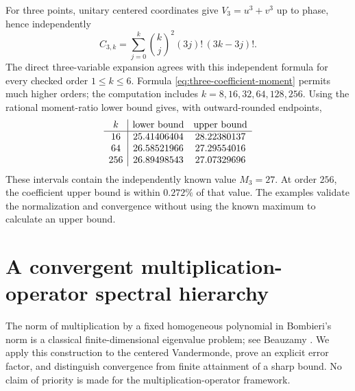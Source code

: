 \documentclass[11pt]{article}
\theoremstyle{remark}
\numberwithin{equation}{section}
\begin{document}
For three points, unitary centered coordinates give
$V_3=u^3+v^3$ up to phase, hence independently
\begin{equation}\label{eq:three-coefficient-moment}
 C_{3,k}=\sum_{j=0}^k\binom kj^2(3j)!\,(3k-3j)!.
\end{equation}
The direct three-variable expansion agrees with this independent
formula for every checked order $1\le k\le6$. Formula
\eqref{eq:three-coefficient-moment} permits much higher orders;
the computation includes $k=8,16,32,64,128,256$. Using the rational
moment-ratio lower bound gives, with outward-rounded endpoints,
\[
 \begin{array}{c|cc}
 k&\hbox{lower bound}&\hbox{upper bound}\\\hline
 16&25.41406404&28.22380137\\
 64&26.58521966&27.29554016\\
 256&26.89498543&27.07329696
 \end{array}
\]
These intervals contain the independently known value $M_3=27$.
At order $256$, the coefficient upper bound is within $0.272\%$
of that value. The examples validate the normalization and
convergence without using the known maximum to calculate an upper
bound.

\section{A convergent multiplication-operator spectral hierarchy}
\label{sec:spectral-hierarchy}
The norm of multiplication by a fixed homogeneous polynomial in
Bombieri's norm is a classical finite-dimensional eigenvalue problem;
see Beauzamy \cite{Beauzamy}. We apply this construction to the centered
Vandermonde, prove an explicit error factor, and distinguish convergence
from finite attainment of a sharp bound. No claim of priority is made
for the multiplication-operator framework.
\end{document}
